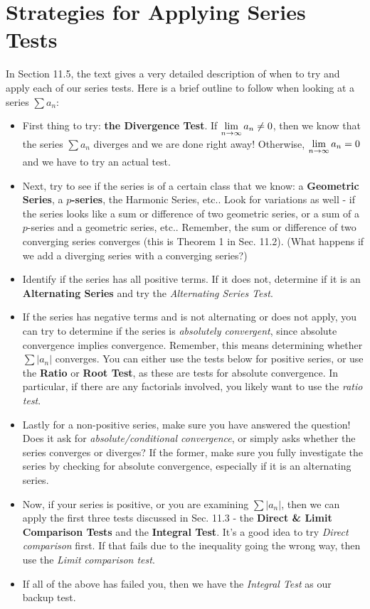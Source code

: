 \documentclass{ximera}
\begin{document}
\section*{Strategies for Applying Series Tests} In Section 11.5, the text gives a very detailed description of when to try and apply each of our series tests. Here is a brief outline to follow when looking at a series $\sum a_n$:
	\begin{itemize}
		\item First thing to try: \textbf{the Divergence Test}. If $\displaystyle \lim_{n \to \infty} a_n \neq 0$, then we know that the series $\sum a_n$ diverges and we are done right away! Otherwise, $\displaystyle \lim_{n \to \infty} a_n = 0$ and we have to try an actual test.
		
		\item Next, try to see if the series is of a certain class that we know: a \textbf{Geometric Series}, a \textbf{$p$-series}, the Harmonic Series, etc.. Look for variations as well - if the series looks like a sum or difference of two geometric series, or a sum of a $p$-series and a geometric series, etc.. Remember, the sum or difference of two converging series converges (this is Theorem 1 in Sec. 11.2). (What happens if we add a diverging series with a converging series?)
		
		\item Identify if the series has all positive terms. If it does not, determine if it is an \textbf{Alternating Series} and try the \emph{Alternating Series Test}.
		
		\item If the series has negative terms and is not alternating or does not apply, you can try to determine if the series is \emph{absolutely convergent}, since absolute convergence implies convergence. Remember, this means determining whether $\sum |a_n|$ converges. You can either use the tests below for positive series, or use the \textbf{Ratio} or \textbf{Root Test}, as these are tests for absolute convergence. In particular, if there are any factorials involved, you likely want to use the \emph{ratio test}.
		
		\item Lastly for a non-positive series, make sure you have answered the question! Does it ask for \emph{absolute/conditional convergence}, or simply asks whether the series converges or diverges? If the former, make sure you fully investigate the series by checking for absolute convergence, especially if it is an alternating series.
		
		\item Now, if your series is positive, or you are examining $\sum |a_n|$, then we can apply the first three tests discussed in Sec. 11.3 - the \textbf{Direct \& Limit Comparison Tests} and the \textbf{Integral Test}. It's a good idea to try \emph{Direct comparison} first. If that fails due to the inequality going the wrong way, then use the \emph{Limit comparison test}.
		
		\item If all of the above has failed you, then we have the \emph{Integral Test} as our backup test. 
	\end{itemize}	
\end{document}
